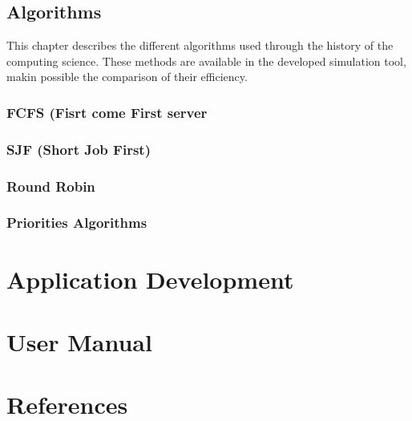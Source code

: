 \documentclass{report}
\begin{document}
    \section{Algorithms}
        This chapter describes the different algorithms used through the history of the computing science. These methods are available in the developed simulation tool, makin possible the comparison of their efficiency.
        \subsection{FCFS (Fisrt come First server}
        \subsection{SJF (Short Job First)}
        \subsection{Round Robin}
        \subsection{Priorities Algorithms}

\chapter{Application Development}
\chapter{User Manual}
\chapter{References}
\end{document}
